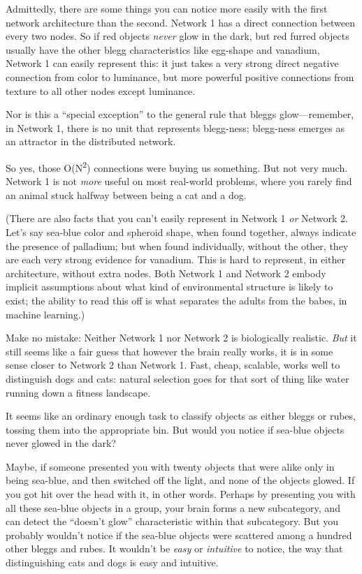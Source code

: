 {
 Admittedly, there are some things you can notice more easily with
the first network architecture than the second. Network 1 has a direct
connection between every two nodes. So if red objects \textit{never}
glow in the dark, but red furred objects usually have the other blegg
characteristics like egg-shape and vanadium, Network 1 can easily
represent this: it just takes a very strong direct negative connection
from color to luminance, but more powerful positive connections from
texture to all other nodes except luminance.}

{
 Nor is this a ``special
exception'' to the general rule that bleggs
glow---remember, in Network 1, there is no unit that represents
blegg-ness; blegg-ness emerges as an attractor in the distributed
network.}

{
 So yes, those O(N\textsuperscript{2}) connections were buying us
something. But not very much. Network 1 is not \textit{more} useful on
most real-world problems, where you rarely find an animal stuck halfway
between being a cat and a dog.}

{
 (There are also facts that you can't easily
represent in Network 1 \textit{or} Network 2. Let's say
sea-blue color and spheroid shape, when found together, always indicate
the presence of palladium; but when found individually, without the
other, they are each very strong evidence for vanadium. This is hard to
represent, in either architecture, without extra nodes. Both Network 1
and Network 2 embody implicit assumptions about what kind of
environmental structure is likely to exist; the ability to read this
off is what separates the adults from the babes, in machine learning.)}

{
 Make no mistake: Neither Network 1 nor Network 2 is biologically
realistic. \textit{But} it still seems like a fair guess that however
the brain really works, it is in some sense closer to Network 2 than
Network 1. Fast, cheap, scalable, works well to distinguish dogs and
cats: natural selection goes for that sort of thing like water running
down a fitness landscape.}

{
 It seems like an ordinary enough task to classify objects as
either bleggs or rubes, tossing them into the appropriate bin. But
would you notice if sea-blue objects never glowed in the dark?}

{
 Maybe, if someone presented you with twenty objects that were
alike only in being sea-blue, and then switched off the light, and none
of the objects glowed. If you got hit over the head with it, in other
words. Perhaps by presenting you with all these sea-blue objects in a
group, your brain forms a new subcategory, and can detect the
``doesn't glow''
characteristic within that subcategory. But you probably
wouldn't notice if the sea-blue objects were scattered
among a hundred other bleggs and rubes. It wouldn't be
\textit{easy} or \textit{intuitive} to notice, the way that
distinguishing cats and dogs is easy and intuitive.}


